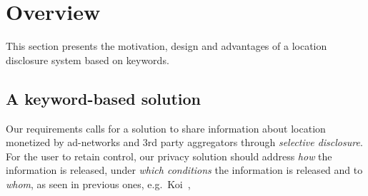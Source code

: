 \section{Overview}
\label{sec:overview}
This section presents the motivation, design and advantages of a location disclosure system based on keywords. 

\subsection{A keyword-based solution}
\label{subsec:key}


Our requirements calls for a solution to share information about location monetized by ad-networks and 3rd party aggregators through \emph{selective disclosure}. For the user to retain control, our privacy solution should address \emph{how} the information is released, under \emph{which conditions} the information is released and to \emph{whom}, as seen in previous ones, e.g.~Koi~\cite{guha:koi}, 


